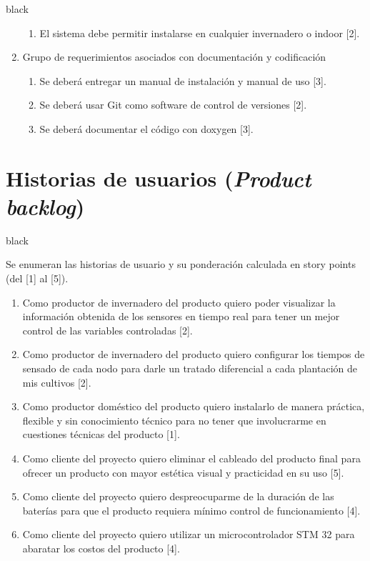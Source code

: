 \documentclass[11pt]{charter}
\begin{document}
\begin{consigna}{black}
\begin{enumerate}
\begin{enumerate}
	\item El sistema debe permitir instalarse en cualquier invernadero o indoor [2].
	\end{enumerate}
\item Grupo de requerimientos asociados con documentación y codificación
	\begin{enumerate}
	\item Se deberá entregar un manual de instalación y manual de uso [3].
	\item Se deberá usar Git como software de control de versiones [2].
	\item Se deberá documentar el código con doxygen [3].
	\end{enumerate}


\end{enumerate}

\end{consigna}

\section{Historias de usuarios (\textit{Product backlog})}
\label{sec:backlog}

\begin{consigna}{black}

Se enumeran las historias de usuario y su ponderación calculada en story points (del [1] al [5]).

\begin{enumerate}
\item Como productor de invernadero del producto quiero poder visualizar la información obtenida de los sensores en tiempo real para tener un mejor control de las variables controladas [2].

\item Como productor de invernadero del producto quiero configurar los tiempos de sensado de cada nodo para darle un tratado diferencial a cada plantación de mis cultivos [2].

\item Como productor doméstico del producto quiero instalarlo de manera práctica, flexible y sin conocimiento técnico para no tener que involucrarme en cuestiones técnicas del producto [1].

\item Como cliente del proyecto quiero eliminar el cableado del producto final para ofrecer un producto con mayor estética visual y practicidad en su uso [5].

\item Como cliente del proyecto quiero despreocuparme de la duración de las baterías para que el producto requiera mínimo control de funcionamiento [4].

\item Como cliente del proyecto quiero utilizar un microcontrolador STM 32 para abaratar los costos del producto [4].

\end{enumerate}


\end{consigna}
\end{document}
